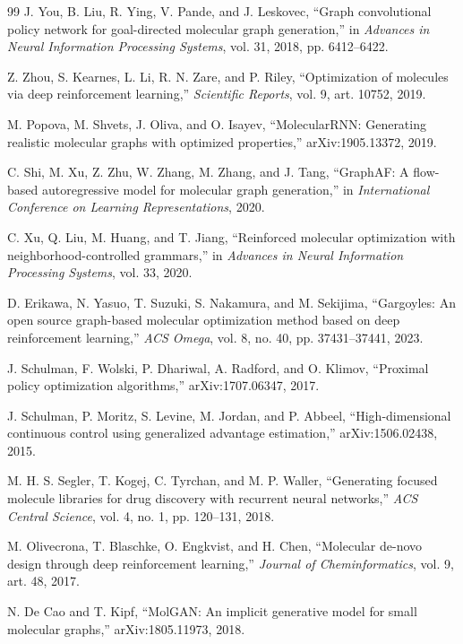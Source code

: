 \documentclass{ieeeaccess}
\begin{document}
\begin{thebibliography}{99}
J. You, B. Liu, R. Ying, V. Pande, and J. Leskovec,
``Graph convolutional policy network for goal-directed molecular graph generation,''
in \emph{Advances in Neural Information Processing Systems}, vol. 31, 2018, pp. 6412--6422.

Z. Zhou, S. Kearnes, L. Li, R. N. Zare, and P. Riley,
``Optimization of molecules via deep reinforcement learning,''
\emph{Scientific Reports}, vol. 9, art. 10752, 2019.

M. Popova, M. Shvets, J. Oliva, and O. Isayev,
``MolecularRNN: Generating realistic molecular graphs with optimized properties,''
arXiv:1905.13372, 2019.

C. Shi, M. Xu, Z. Zhu, W. Zhang, M. Zhang, and J. Tang,
``GraphAF: A flow-based autoregressive model for molecular graph generation,''
in \emph{International Conference on Learning Representations}, 2020.

C. Xu, Q. Liu, M. Huang, and T. Jiang,
``Reinforced molecular optimization with neighborhood-controlled grammars,''
in \emph{Advances in Neural Information Processing Systems}, vol. 33, 2020.

D. Erikawa, N. Yasuo, T. Suzuki, S. Nakamura, and M. Sekijima,
``Gargoyles: An open source graph-based molecular optimization method based on deep reinforcement learning,''
\emph{ACS Omega}, vol. 8, no. 40, pp. 37431--37441, 2023.

J. Schulman, F. Wolski, P. Dhariwal, A. Radford, and O. Klimov,
``Proximal policy optimization algorithms,''
arXiv:1707.06347, 2017.

J. Schulman, P. Moritz, S. Levine, M. Jordan, and P. Abbeel,
``High-dimensional continuous control using generalized advantage estimation,''
arXiv:1506.02438, 2015.

M. H. S. Segler, T. Kogej, C. Tyrchan, and M. P. Waller,
``Generating focused molecule libraries for drug discovery with recurrent neural networks,''
\emph{ACS Central Science}, vol. 4, no. 1, pp. 120--131, 2018.

M. Olivecrona, T. Blaschke, O. Engkvist, and H. Chen,
``Molecular de-novo design through deep reinforcement learning,''
\emph{Journal of Cheminformatics}, vol. 9, art. 48, 2017.

N. De Cao and T. Kipf,
``MolGAN: An implicit generative model for small molecular graphs,''
arXiv:1805.11973, 2018.


\end{thebibliography}
\end{document}
